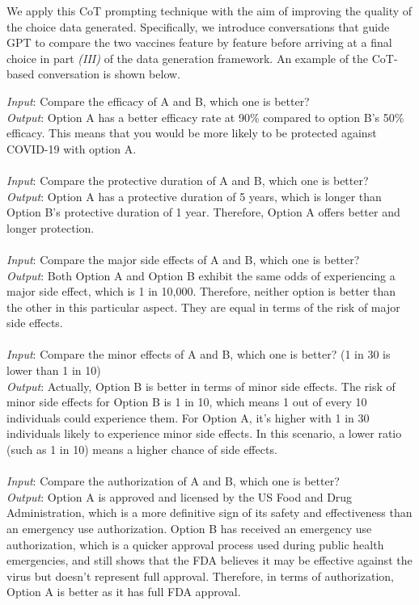 We apply this CoT prompting technique with the aim of improving the quality of the choice data generated. Specifically, we introduce conversations that guide GPT to compare the two vaccines feature by feature before arriving at a final choice in part \textit{(III)} of the data generation framework. An example of the CoT-based conversation is shown below.

\vspace{15pt}

\begin{mdframed}
{\footnotesize
\textit{Input}: Compare the efficacy of A and B, which one is better?\\
\textit{Output}: Option A has a better efficacy rate at 90\% compared to option B's 50\% efficacy. This means that you would be more likely to be protected against COVID-19 with option A.\\\\
\textit{Input}: Compare the protective duration of A and B, which one is better?\\
\textit{Output}: Option A has a protective duration of 5 years, which is longer than Option B's protective duration of 1 year. Therefore, Option A offers better and longer protection.\\\\
\textit{Input}: Compare the major side effects of A and B, which one is better?\\
\textit{Output}: Both Option A and Option B exhibit the same odds of experiencing a major side effect, which is 1 in 10,000. Therefore, neither option is better than the other in this particular aspect. They are equal in terms of the risk of major side effects.\\\\
\textit{Input}: Compare the minor effects of A and B, which one is better? (1 in 30 is lower than 1 in 10)\\
\textit{Output}: Actually, Option B is better in terms of minor side effects. The risk of minor side effects for Option B is 1 in 10, which means 1 out of every 10 individuals could experience them. For Option A, it's higher with 1 in 30 individuals likely to experience minor side effects. In this scenario, a lower ratio (such as 1 in 10) means a higher chance of side effects.\\\\
\textit{Input}: Compare the authorization of A and B, which one is better?\\
\textit{Output}: Option A is approved and licensed by the US Food and Drug Administration, which is a more definitive sign of its safety and effectiveness than an emergency use authorization. Option B has received an emergency use authorization, which is a quicker approval process used during public health emergencies, and still shows that the FDA believes it may be effective against the virus but doesn't represent full approval. Therefore, in terms of authorization, Option A is better as it has full FDA approval.\\\\
}
\end{mdframed}
